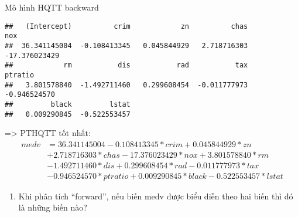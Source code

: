 \documentclass[
]{article}
\newenvironment{Shaded}{\begin{snugshade}}{\end{snugshade}}
\newcommand{\AttributeTok}[1]{\textcolor[rgb]{0.77,0.63,0.00}{#1}}
\newcommand{\DecValTok}[1]{\textcolor[rgb]{0.00,0.00,0.81}{#1}}
\newcommand{\FunctionTok}[1]{\textcolor[rgb]{0.00,0.00,0.00}{#1}}
\newcommand{\NormalTok}[1]{#1}
\newcommand{\OtherTok}[1]{\textcolor[rgb]{0.56,0.35,0.01}{#1}}
\newcommand{\SpecialCharTok}[1]{\textcolor[rgb]{0.00,0.00,0.00}{#1}}
\newcommand{\StringTok}[1]{\textcolor[rgb]{0.31,0.60,0.02}{#1}}
\providecommand{\tightlist}{%
  \setlength{\itemsep}{0pt}\setlength{\parskip}{0pt}}
\begin{document}
Mô hình HQTT backward

\begin{Shaded}
\end{Shaded}

\begin{verbatim}
##   (Intercept)          crim            zn          chas           nox 
##  36.341145004  -0.108413345   0.045844929   2.718716303 -17.376023429 
##            rm           dis           rad           tax       ptratio 
##   3.801578840  -1.492711460   0.299608454  -0.011777973  -0.946524570 
##         black         lstat 
##   0.009290845  -0.522553457
\end{verbatim}

=\textgreater{} PTHQTT tốt nhất: \[
\begin{aligned}
medv &= 36.341145004  -0.108413345*crim  + 0.045844929*zn \\ 
&+ 2.718716303*chas -17.376023429 * nox + 3.801578840 * rm  \\
&-1.492711460*dis +  0.299608454*rad   -0.011777973 * tax \\
&-0.946524570*ptratio + 0.009290845 * black  -0.522553457 *lstat
\end{aligned}
\]

\begin{enumerate}
\def\labelenumi{\alph{enumi})}
\setcounter{enumi}{1}
\tightlist
\item
  Khi phân tích ``forward'', nếu biến medv được biểu diễn theo hai biến
  thì đó là những biến nào?
\end{enumerate}

\begin{Shaded}
\end{Shaded}
\end{document}
